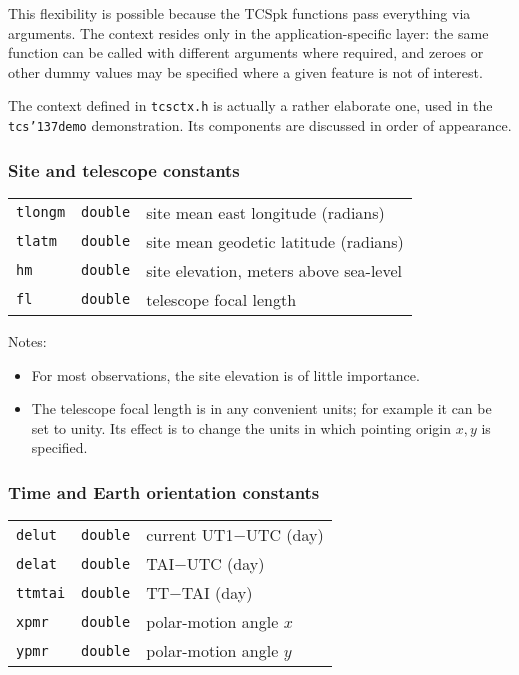 \documentclass[12pt,fleqn,twoside]{article}
\renewcommand{\_}{{\tt\char'137}}     %
\newcommand{\notelist}  {\goodbreak \vspace{1ex} Notes:
                        \vspace{-3ex}}
\begin{document}
This flexibility is possible because the TCSpk functions pass everything
via arguments.  The context resides only in the application-specific
layer:  the same function can be called with different
arguments where required,
and zeroes or other dummy values may be specified where a given
feature is not of interest.

The context defined in {\tt tcsctx.h} is actually a rather
elaborate one, used in the {\tt tcs\_demo} demonstration.  Its
components are discussed in order of appearance.

\subsubsection{Site and telescope constants}
\begin{tabular}{lll}
{\tt tlongm} & {\tt double} & site mean east longitude (radians) \\
{\tt tlatm}  & {\tt double} & site mean geodetic latitude (radians) \\
{\tt hm}     & {\tt double} & site elevation, meters above sea-level \\
{\tt fl}     & {\tt double} & telescope focal length \\
\end{tabular}

\notelist
\begin{itemize}
\item For most observations, the site elevation is of little
      importance.
\item The telescope focal length is in any convenient units;  for
      example it can be set to unity. Its effect is to change the
      units in which pointing origin $x,y$ is specified.
\end{itemize}

\subsubsection{Time and Earth orientation constants}
\begin{tabular}{lll}
{\tt delut}  & {\tt double} & current UT1$-$UTC (day) \\
{\tt delat}  & {\tt double} & TAI$-$UTC (day) \\
{\tt ttmtai} & {\tt double} & TT$-$TAI (day) \\
{\tt xpmr}   & {\tt double} & polar-motion angle $x$ \\
{\tt ypmr}   & {\tt double} & polar-motion angle $y$ \\
\end{tabular}
\end{document}

